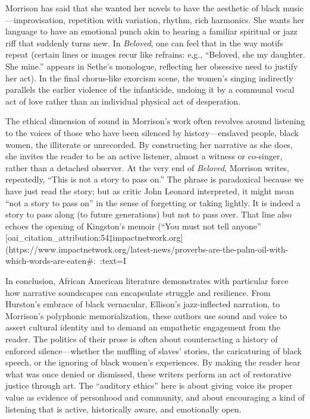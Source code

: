 \documentclass[12pt]{report}
\begin{document}
Morrison has said that she wanted her novels to have the aesthetic of black music—improvisation, repetition with variation, rhythm, rich harmonics. She wants her language to have an emotional punch akin to hearing a familiar spiritual or jazz riff that suddenly turns new. In \textit{Beloved}, one can feel that in the way motifs repeat (certain lines or images recur like refrains: e.g., “Beloved, she my daughter. She mine.” appears in Sethe’s monologue, reflecting her obsessive need to justify her act). In the final chorus-like exorcism scene, the women’s singing indirectly parallels the earlier violence of the infanticide, undoing it by a communal vocal act of love rather than an individual physical act of desperation.

The ethical dimension of sound in Morrison’s work often revolves around listening to the voices of those who have been silenced by history—enslaved people, black women, the illiterate or unrecorded. By constructing her narrative as she does, she invites the reader to be an active listener, almost a witness or co-singer, rather than a detached observer. At the very end of \textit{Beloved}, Morrison writes, repeatedly, “This is not a story to pass on.” The phrase is paradoxical because we have just read the story; but as critic John Leonard interpreted, it might mean “not a story to pass on” in the sense of forgetting or taking lightly. It is indeed a story to pass along (to future generations) but not to pass over. That line also echoes the opening of Kingston’s memoir (“You must not tell anyone” [oai_citation_attribution:54‡impactnetwork.org](https://www.impactnetwork.org/latest-news/proverbs-are-the-palm-oil-with-which-words-are-eaten#:~:text=I%

In conclusion, African American literature demonstrates with particular force how narrative soundscapes can encapsulate struggle and resilience. From Hurston’s embrace of black vernacular, Ellison’s jazz-inflected narration, to Morrison’s polyphonic memorialization, these authors use sound and voice to assert cultural identity and to demand an empathetic engagement from the reader. The politics of their prose is often about counteracting a history of enforced silence—whether the muffling of slaves’ stories, the caricaturing of black speech, or the ignoring of black women’s experiences. By making the reader hear what was once denied or dismissed, these writers perform an act of restorative justice through art. The “auditory ethics” here is about giving voice its proper value as evidence of personhood and community, and about encouraging a kind of listening that is active, historically aware, and emotionally open.
\end{document}
